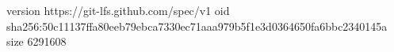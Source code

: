 version https://git-lfs.github.com/spec/v1
oid sha256:50c11137ffa80eeb79ebca7330ec71aaa979b5f1e3d0364650fa6bbc2340145a
size 6291608
